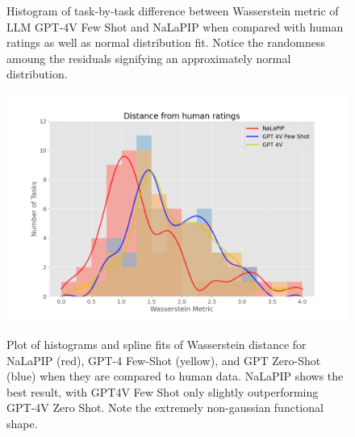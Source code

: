 \documentclass[10pt,letterpaper]{article}
\begin{document}
\begin{figure}[h]
{        \label{fig:wasserstein_distance_by_runtime}
        \caption{Histogram of task-by-task difference between Wasserstein metric of LLM GPT-4V Few Shot and NaLaPIP when compared with human ratings as well as normal distribution fit. Notice the randomness amoung the residuals signifying an approximately normal distribution. }
    }
\end{figure}

\begin{figure}[h]
\centering
        \includegraphics[scale=0.25]{images/wasserstein_distance.png}
        \label{fig:wasserstein_distance_by_runtime}
        \caption{Plot of histograms and spline fits of Wasserstein distance for NaLaPIP (red), GPT-4 Few-Shot (yellow), and GPT Zero-Shot (blue) when they are compared to human data. NaLaPIP shows the best result, with GPT4V Few Shot only slightly outperforming GPT-4V Zero Shot. Note the extremely non-gaussian functional shape.}
\end{figure}
\end{document}
